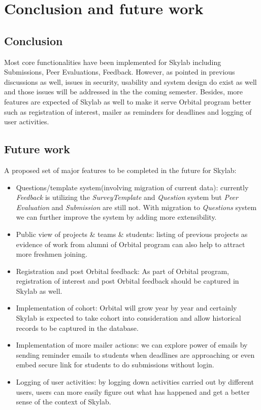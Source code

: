 \chapter{Conclusion and future work}

\section{Conclusion}

Most core functionalities have been implemented for Skylab including Submissions, Peer Evaluations, Feedback. However, as pointed in previous discussions as well, issues in security, usability and system design do exist as well and those issues will be addressed in the the coming semester. Besides, more features are expected of Skylab as well to make it serve Orbital program better such as registration of interest, mailer as reminders for deadlines and logging of user activities.

\section{Future work}

A proposed set of major features to be completed in the future for Skylab:

\begin{itemize}
  \item Questions/template system(involving migration of current data): currently \textit{Feedback} is utilizing the \textit{SurveyTemplate} and \textit{Question} system but \textit{Peer Evaluation} and \textit{Submission} are still not. With migration to \textit{Questions} system we can further improve the system by adding more extensibility.
  \item Public view of projects \& teams \& students: listing of previous projects as evidence of work from alumni of Orbital program can also help to attract more freshmen joining.
  \item Registration and post Orbital feedback: As part of Orbital program, registration of interest and post Orbital feedback should be captured in Skylab as well.
  \item Implementation of cohort: Orbital will grow year by year and certainly Skylab is expected to take cohort into consideration and allow historical records to be captured in the database.
  \item Implementation of more mailer actions: we can explore power of emails by sending reminder emails to students when deadlines are approaching or even embed secure link for students to do submissions without login.
  \item Logging of user activities: by logging down activities carried out by different users, users can more easily figure out what has happened and get a better sense of the context of Skylab.
\end{itemize}
